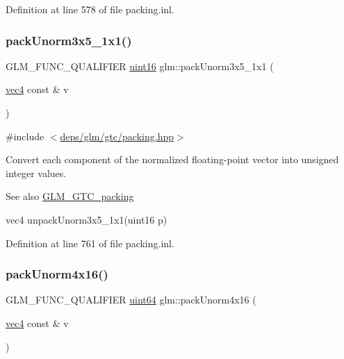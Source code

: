 Definition at line 578 of file packing.\+inl.

\mbox{\label{group__gtc__packing_ga1b41375846ed66768da78ca299d8d010}} 
\subsubsection{\texorpdfstring{pack\+Unorm3x5\+\_\+1x1()}{packUnorm3x5\_1x1()}}
{\footnotesize\ttfamily G\+L\+M\+\_\+\+F\+U\+N\+C\+\_\+\+Q\+U\+A\+L\+I\+F\+I\+ER \hyperlink{group__gtc__type__precision_gad8c2939e1fdd8e5828b31d95c52255d5}{uint16} glm\+::pack\+Unorm3x5\+\_\+1x1 (\begin{DoxyParamCaption}\item[{\hyperlink{group__core__types_ga5881b1b022d7fd1b7218f5916532dd02}{vec4} const \&}]{v }\end{DoxyParamCaption})}



{\ttfamily \#include $<$\hyperlink{gtc_2packing_8hpp}{deps/glm/gtc/packing.\+hpp}$>$}

Convert each component of the normalized floating-\/point vector into unsigned integer values.

\begin{DoxySeeAlso}{See also}
\hyperlink{group__gtc__packing}{G\+L\+M\+\_\+\+G\+T\+C\+\_\+packing} 

vec4 unpack\+Unorm3x5\+\_\+1x1(uint16 p) 
\end{DoxySeeAlso}


Definition at line 761 of file packing.\+inl.

\mbox{\label{group__gtc__packing_gac561f06c908b7302537a8ef29fcb409e}} 
\subsubsection{\texorpdfstring{pack\+Unorm4x16()}{packUnorm4x16()}}
{\footnotesize\ttfamily G\+L\+M\+\_\+\+F\+U\+N\+C\+\_\+\+Q\+U\+A\+L\+I\+F\+I\+ER \hyperlink{group__gtc__type__precision_gae3632bf9b37da66233d78930dd06378a}{uint64} glm\+::pack\+Unorm4x16 (\begin{DoxyParamCaption}\item[{\hyperlink{group__core__types_ga5881b1b022d7fd1b7218f5916532dd02}{vec4} const \&}]{v }\end{DoxyParamCaption})}




